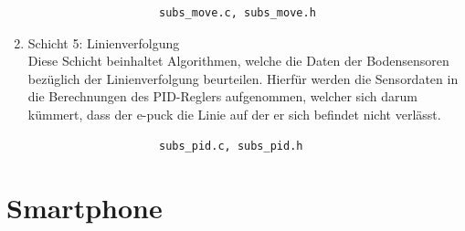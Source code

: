 \documentclass[10pt,a4paper]{article}
\let\oldsection\section
\renewcommand{\section}{\newpage \oldsection}
\begin{document}
\begin{enumerate}
					\begin{verbatim}  
					subs_move.c, subs_move.h
					\end{verbatim}

  				\item Schicht 5: Linienverfolgung \\
					Diese Schicht beinhaltet Algorithmen, welche die Daten der Bodensensoren bezüglich  der Linienverfolgung beurteilen. Hierfür werden die
					Sensordaten in die Berechnungen des PID-Reglers aufgenommen, welcher sich darum kümmert, 	dass der e-puck die Linie auf der er sich
					befindet nicht verlässt.

					\begin{verbatim}
					subs_pid.c, subs_pid.h
					\end{verbatim}

  			\end{enumerate}		
			
		\section{Smartphone}
\end{document}
